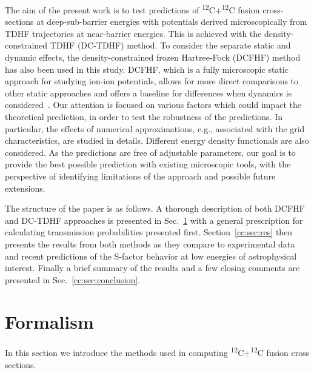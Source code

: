
The aim of the present work is to test predictions of  \textsuperscript{12}C+\textsuperscript{12}C fusion cross-sections 
at deep-sub-barrier energies with potentials derived microscopically from TDHF trajectories at near-barrier energies.
This is achieved with the density-constrained TDHF (DC-TDHF) method. 
To consider the separate static and dynamic effects, the density-constrained frozen Hartree-Fock (DCFHF) method has also been used in this study.
DCFHF, which is a fully microscopic static approach for studying ion-ion potentials, 
allows for more direct comparisons to other static approaches and offers a baseline for differences when dynamics is considered~\protect\citep{simenel2017}. 
Our attention is focused on various factors which could impact the theoretical prediction, in order to test the robustness of the predictions. 
In particular, the effects of numerical approximations, e.g., associated with the grid characteristics, are studied in details. 
Different energy density functionals are also considered.
As the predictions are free of adjustable parameters, our goal is to provide the best possible prediction with existing microscopic tools, 
with the perspective of identifying limitations of the approach and possible future extensions.

The structure of the paper is as follows. A thorough description of both DCFHF and DC-TDHF approaches is presented in Sec.~\ref{sec:form} 
with a general prescription for calculating transmission probabilities presented first. 
Section~\ref{cc:sec:res} then presents the results from both methods as they compare to experimental data 
and recent predictions of the S-factor behavior at low energies of astrophysical interest. 
Finally a brief summary of the results and a few closing comments are presented in Sec.~\ref{cc:sec:conclusion}.

\section{Formalism}
\label{sec:form}
In this section we introduce the methods used in computing \textsuperscript{12}C+\textsuperscript{12}C fusion cross sections.
